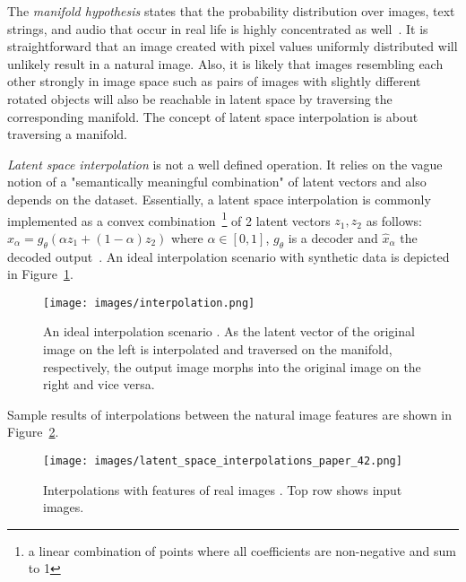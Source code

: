 \documentclass[12pt,a4paper]{article}
\begin{document}
The \textit{manifold hypothesis} states that the probability distribution over images, text strings, and audio that occur in real life is highly concentrated as well~\cite{ReprLearning}. It is straightforward that an image created with pixel values uniformly distributed will unlikely result in a natural image. Also, it is likely that images resembling each other strongly in image space such as pairs of images with slightly different rotated objects will also be reachable in latent space by traversing the corresponding manifold. The concept of latent space interpolation is about traversing a manifold.

\textit{Latent space interpolation} is not a well defined operation. It relies on the vague notion of a "semantically meaningful combination" of latent vectors and also depends on the dataset. Essentially, a latent space interpolation is commonly implemented as a convex combination~\footnote{a linear combination of points where all coefficients are non-negative and sum to 1} of 2 latent vectors $z_1, z_2$ as follows: $\hat{x}_{\alpha} = g_{\theta}(\alpha z_1+(1-\alpha)z_2)$ where $\alpha \in [0,1]$, $g_{\theta}$ is a decoder and $\hat{x}_{\alpha}$ the decoded output~\cite{AE_Interp}. An ideal interpolation scenario with synthetic data is depicted in Figure~\ref{fig:interpolation_ideal}.
\begin{figure}[ht]
\centering
\texttt{[image: images/interpolation.png]}
\caption{An ideal interpolation scenario \cite{InkscapeInterpolation}. As the latent vector of the original image on the left is interpolated and traversed on the manifold, respectively, the output image morphs into the original image on the right and vice versa.}
\label{fig:interpolation_ideal}
\end{figure}

Sample results of interpolations between the natural image features are shown in Figure~\ref{fig:interpolation_real}.
\begin{figure}[ht]
\centering
\texttt{[image: images/latent\_space\_interpolations\_paper\_42.png]}
\caption{Interpolations with features of real images \cite{InterpolExamples}. Top row shows input images.}
\label{fig:interpolation_real}
\end{figure}


\end{document}
